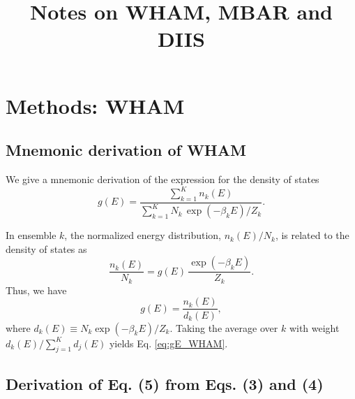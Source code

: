 \documentclass[aip,jcp,preprint,notitlepage, superscriptaddress]{revtex4-1}
\begin{document}
\renewcommand{\theequation}{N.\arabic{equation}}

\newcommand{\vct}[1]{\mathbf{#1}}
\newcommand{\vx}{\vct{x}}
\newcommand{\vy}{\vct{y}}
\newcommand{\Z}{\mathcal{Z}}
\newcommand{\E}{\mathcal{E}}
\newcommand{\Ham}{\mathcal{H}}
\newcommand{\W}{\mathcal{W}}




\title{Notes on WHAM, MBAR and DIIS}

\maketitle



\section{Methods: WHAM}



\subsection{Mnemonic derivation of WHAM}



We give a mnemonic derivation of the expression
for the density of states
%
\begin{equation}
g(E)
=
\frac{
  \sum_{k = 1}^K n_k(E)
}
{
  \sum_{k = 1}^K N_k \, \exp(-\beta_k E) / Z_k
}.
\label{eq:gE_WHAM}
\end{equation}
%

In ensemble $k$,
the normalized energy distribution,
$n_k(E) / N_k$,
is related to the density of states as
%
\begin{equation}
\frac{ n_k(E) } { N_k }
=
g(E) \,
\frac{ \exp(-\beta_k E) } { Z_k }.
\end{equation}
%
Thus,
we have
%
\begin{equation}
g(E)
=
\frac{ n_k(E) }
     { d_k(E) },
\label{eq:gE_single}
\end{equation}
where
$d_k(E) \equiv N_k \exp(-\beta_k E) / Z_k$.
%
Taking the average over $k$ with
weight $d_k(E) / \sum_{j = 1}^K d_j(E)$
yields Eq. \eqref{eq:gE_WHAM}.



\subsection{Derivation of Eq. (5) from Eqs. (3) and (4)}
\end{document}

